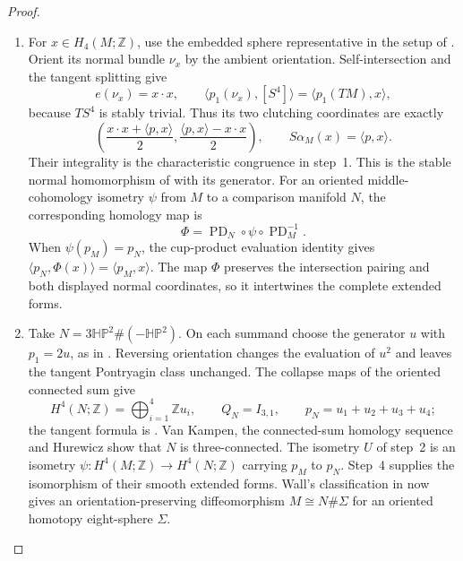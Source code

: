 \begin{proof}
\begin{enumerate}[label={$\langle1\rangle$\arabic*.}]
\item For $x\in H_4(M;\mathbb Z)$, use the embedded sphere
representative in the setup of
\cite[\S3.3, pp.~11--12]{IVVWallForm}. Orient its normal bundle
$\nu_x$ by the ambient orientation. Self-intersection and the
tangent splitting give
\[
e(\nu_x)=x\cdot x,\qquad
\langle p_1(\nu_x),[S^4]\rangle=\langle p_1(TM),x\rangle,
\]
because $TS^4$ is stably trivial. Thus its two clutching coordinates
are exactly
\[
\left(\frac{x\cdot x+\langle p,x\rangle}{2},
      \frac{\langle p,x\rangle-x\cdot x}{2}\right),
\qquad S\alpha_M(x)=\langle p,x\rangle.
\]
Their integrality is the characteristic congruence in step~1.
This is the stable normal homomorphism of
\cite[Definition~3.6, p.~12]{IVVWallForm} with its generator.
For an oriented middle-cohomology isometry $\psi$ from $M$ to a
comparison manifold $N$, the corresponding homology map is
\[
\Phi=\operatorname{PD}_N\circ\psi\circ\operatorname{PD}_M^{-1}.
\]
When $\psi(p_M)=p_N$, the cup-product evaluation identity gives
$\langle p_N,\Phi(x)\rangle=\langle p_M,x\rangle$.
The map $\Phi$ preserves the intersection pairing and both displayed
normal coordinates, so it intertwines the complete extended forms.

\item Take $N=3\mathbb H\mathbb P^2\#(-\mathbb H\mathbb P^2)$.
On each summand choose the generator $u$ with $p_1=2u$, as in
\cite[Lemma~2.1, p.~5]{ffMandal}. Reversing orientation changes
the evaluation of $u^2$ and leaves the tangent Pontryagin class
unchanged. The collapse maps of the oriented connected sum give
\[
H^4(N;\mathbb Z)=\bigoplus_{i=1}^4\mathbb Z u_i,
\qquad Q_N=I_{3,1},\qquad p_N=u_1+u_2+u_3+u_4;
\]
the tangent formula is
\cite[Theorem~2.4, p.~7]{ffMandal}.
Van Kampen, the connected-sum homology sequence and Hurewicz show
that $N$ is three-connected. The isometry $U$ of step~2 is an
isometry $\psi:H^4(M;\mathbb Z)\to H^4(N;\mathbb Z)$ carrying
$p_M$ to $p_N$. Step~4 supplies the isomorphism of their smooth
extended forms. Wall's classification in
\cite[Theorem~3.7(1), pp.~13--14]{IVVWallForm} now gives an
orientation-preserving diffeomorphism
$M\cong N\#\Sigma$ for an oriented homotopy eight-sphere $\Sigma$.


\end{enumerate}
\end{proof}
